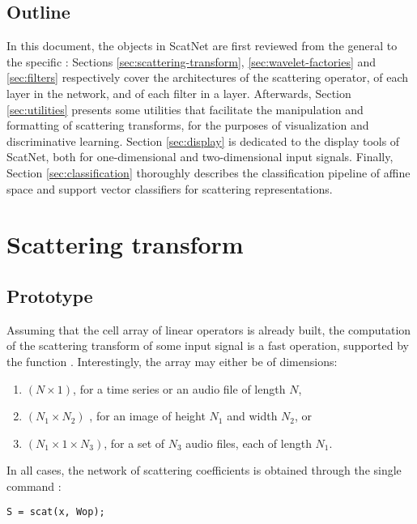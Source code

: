 \documentclass{article}
\begin{document}
\subsection{Outline}
In this document, the objects in ScatNet are first reviewed from the general to the specific : Sections \ref{sec:scattering-transform}, \ref{sec:wavelet-factories} and \ref{sec:filters} respectively cover the architectures of the scattering operator, of each layer in the network, and of each filter in a layer.
Afterwards, Section \ref{sec:utilities} presents some utilities that facilitate the manipulation and formatting of scattering transforms, for the purposes of visualization and discriminative learning.
Section \ref{sec:display} is dedicated to the display tools of ScatNet, both for one-dimensional and two-dimensional input signals.
Finally, Section \ref{sec:classification} thoroughly describes the classification pipeline of affine space and support vector classifiers for scattering representations.

\section{Scattering transform \label{sec:scattering-transform}}

\subsection{Prototype \label{sub:scattering-transform-prototype}}
Assuming that the cell array of linear operators  is already built, the computation of the scattering transform of some input signal  is a fast operation, supported by the function .
Interestingly, the array  may either be of dimensions:

\begin{enumerate}
\item $(N \times 1)$, for a time series or an audio file of length $N$,
\item $(N_1 \times N_2)$ , for an image of height $N_1$ and width $N_2$, or
\item $(N_1 \times 1 \times N_3)$, for a set of $N_3$ audio files, each of length $N_1$.
\end{enumerate}

In all cases, the network of scattering coefficients is obtained through the single command :

\begin{lstlisting}
S = scat(x, Wop);
\end{lstlisting}
\end{document}
